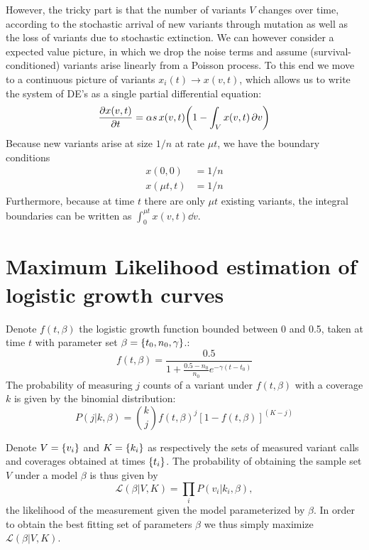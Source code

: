 \documentclass[pdftex,12pt,a4paper]{scrartcl}
\begin{document}
However, the tricky part is that the number of variants $V$ changes over time, according to the stochastic arrival of new variants through mutation as well as the loss of variants due to stochastic extinction. We can however consider a expected value picture, in which we drop the noise terms and assume (survival-conditioned) variants arise linearly from a Poisson process. To this end we move to a continuous picture of variants $x_i(t) \rightarrow x(v,t)$, which allows us to write the system of DE's as a single partial differential equation:
\begin{equation}
    \pdv{x(v,t)}{t} = \alpha s \, x(v,t) \qty( 1 - \int_V x(v,t) \, \partial v )
\end{equation}
Because new variants arise at size $1/n$ at rate $\mu t$, we have the boundary conditions
\begin{align}
    x( 0, 0 ) &= 1/n \\
    x(\mu t, t) &= 1/n
\end{align}
Furthermore, because at time $t$ there are only $\mu t$ existing variants, the integral boundaries can be written as $\int_0^{\mu t} x(v,t) \dd{v}$.


\section{Maximum Likelihood estimation of logistic growth curves}

Denote $f(t, \beta)$ the logistic growth function bounded between 0 and 0.5, taken at time $t$ with parameter set $\beta = \qty{ t_0, n_0, \gamma }$.:
\begin{equation}
f(t,\beta) = \frac{0.5}{1+\frac{0.5-n_0}{n_0}e^{-\gamma (t-t_0)}}
\end{equation}
The probability of measuring $j$ counts of a variant under $f(t, \beta)$ with a coverage $k$ is given by the binomial distribution:
\begin{equation}
P(j \vert k,\beta) = {k \choose j} f(t,\beta)^{j} \left[ 1-f(t,\beta) \right]^{(K-j)}
\end{equation}

Denote $V = \qty{v_{i}}$ and $K = \qty{k_i}$ as respectively the sets of measured variant calls and coverages obtained at times $\qty{t_i}$. The probability of obtaining the sample set $V$ under a model $\beta$ is thus given by
\begin{equation}
\mathcal{L}(\beta \vert V, K) = \prod_{i} P(v_i \vert k_i, \beta),
\end{equation} the likelihood of the measurement given the model parameterized by $\beta$. In order to obtain the best fitting set of parameters $\beta$ we thus simply maximize $\mathcal{L}(\beta \vert V, K)$.
\end{document}
